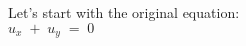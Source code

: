 \documentclass[preview]{standalone}
\begin{document}
\begin{center}
Let's start with the original equation: \\$u_x\; +\; u_y\;$$=\;$$0$
\end{center}
\end{document}

